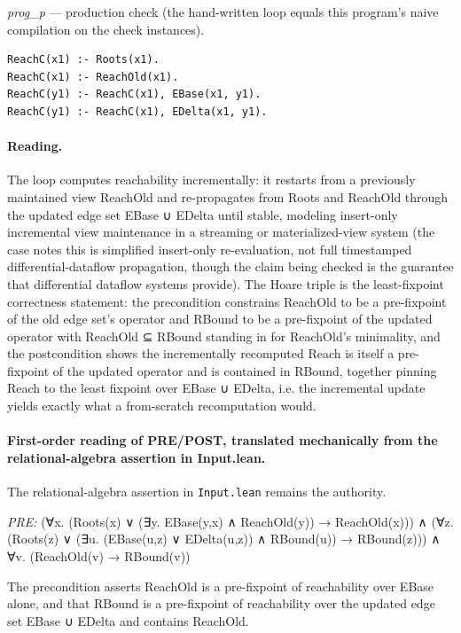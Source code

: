 \documentclass[10pt]{article}
\begin{document}
{\raggedright\textit{prog\_p} --- production check (the hand-written loop equals this program's naive compilation on the check instances).\par}

\begin{Verbatim}[fontsize=\scriptsize,breaklines=true,breakanywhere=true,frame=single,framesep=1.5mm]
ReachC(x1) :- Roots(x1).
ReachC(x1) :- ReachOld(x1).
ReachC(y1) :- ReachC(x1), EBase(x1, y1).
ReachC(y1) :- ReachC(x1), EDelta(x1, y1).
\end{Verbatim}

\paragraph{Reading.} The loop computes reachability incrementally: it restarts from a previously maintained view ReachOld and re-propagates from Roots and ReachOld through the updated edge set EBase ∪ EDelta until stable, modeling insert-only incremental view maintenance in a streaming or materialized-view system (the case notes this is simplified insert-only re-evaluation, not full timestamped differential-dataflow propagation, though the claim being checked is the guarantee that differential dataflow systems provide). The Hoare triple is the least-fixpoint correctness statement: the precondition constrains ReachOld to be a pre-fixpoint of the old edge set's operator and RBound to be a pre-fixpoint of the updated operator with ReachOld ⊆ RBound standing in for ReachOld's minimality, and the postcondition shows the incrementally recomputed Reach is itself a pre-fixpoint of the updated operator and is contained in RBound, together pinning Reach to the least fixpoint over EBase ∪ EDelta, i.e. the incremental update yields exactly what a from-scratch recomputation would.

\paragraph{First-order reading of PRE/POST, translated mechanically from the relational-algebra assertion in Input.lean.} The relational-algebra assertion in \texttt{Input.lean} remains the authority.

\textit{PRE:} (∀x. (Roots(x) ∨ (∃y. EBase(y,x) ∧ ReachOld(y)) → ReachOld(x))) ∧ (∀z. (Roots(z) ∨ (∃u. (EBase(u,z) ∨ EDelta(u,z)) ∧ RBound(u)) → RBound(z))) ∧ ∀v. (ReachOld(v) → RBound(v))\par The precondition asserts ReachOld is a pre-fixpoint of reachability over EBase alone, and that RBound is a pre-fixpoint of reachability over the updated edge set EBase ∪ EDelta and contains ReachOld.
\end{document}
